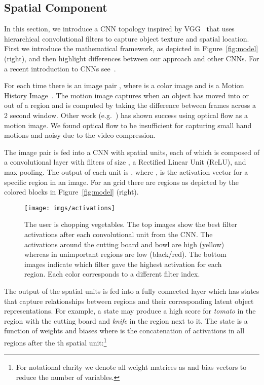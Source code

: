 \documentclass[runningheads]{llncs}
\begin{document}
\subsection{Spatial Component}

In this section, we introduce a CNN topology inspired by VGG~\cite{VGG} that uses hierarchical convolutional filters to capture object texture and spatial location. First we introduce the mathematical framework, as depicted in Figure~\ref{fig:model} (right), and then highlight differences between our approach and other CNNs. For a recent introduction to CNNs see~\cite{Goodfellow_book}.






For each time  there is an image pair , where  is a color image and  is a Motion History Image~\cite{davis_cvpr_1997}. The motion image captures when an object has moved into or out of a region and is computed by taking the difference between frames across a 2 second window.
Other work (e.g.~\cite{simonyan_nips_2014}) has shown success using optical flow as a motion image. We found optical flow to be insufficient for capturing small hand motions and noisy due to the video compression. 


The image pair  is fed into a CNN with  spatial units, each of which is composed of a convolutional layer with  filters of size , a Rectified Linear Unit (ReLU), and  max pooling. The output of each unit is , where , is the activation vector for a specific region in an image. For an  grid there are  regions as depicted by the colored blocks in Figure~\ref{fig:model} (right). 


\begin{figure*}[t]
\center
	\texttt{[image: imgs/activations]}
	\caption{The user is chopping vegetables. The top images show the best filter activations after each convolutional unit from the CNN. The activations around the cutting board and bowl are high (yellow)  whereas in unimportant regions are low (black/red). 
	The bottom images indicate which filter gave the highest activation for each region. Each color corresponds to a different filter index. }	
	\label{fig:activations}
\end{figure*}

The output of the  spatial units is fed into a fully connected layer which has  states that capture relationships between regions and their corresponding latent object representations.
For example, a state may produce a high score for \textit{tomato} in the region with the cutting board and \textit{knife} in the region next to it. 
The state  is a function of weights  and biases  where  is the concatenation of activations in all regions after the th spatial unit:\footnote{For notational clarity we denote all weight matrices as  and bias vectors  to reduce the number of variables.}
\end{document}
